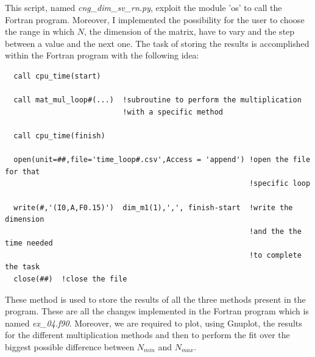\documentclass[prb,9pt,notitlepage]{revtex4-1}
\begin{document}
This script, named \textit{cng\_dim\_sv\_rn.py}, exploit the module 'os' to call the Fortran program. Moreover, I implemented the possibility for the user to choose the range in which $N$, the dimension of the matrix, have to vary and the step between a value and the next one.
\newpage
The task of storing the results is accomplished within the Fortran program with the following idea:

\begin{lstlisting}
  call cpu_time(start)

  call mat_mul_loop#(...)  !subroutine to perform the multiplication
                           !with a specific method

  call cpu_time(finish)

  open(unit=##,file='time_loop#.csv',Access = 'append') !open the file for that
                                                        !specific loop

  write(#,'(I0,A,F0.15)')  dim_m1(1),',', finish-start  !write the dimension
                                                        !and the the time needed
                                                        !to complete the task
  close(##)  !close the file
\end{lstlisting}
These method is used to store the results of all the three methods present in the program. These are all the changes implemented in the Fortran program which is named \textit{ex\_04.f90}.
Moreover, we are required to plot, using Gnuplot, the results for the different multiplication methods and then to perform the fit over the biggest possible difference between $N_{min}$ and $N_{max}$.
\end{document}
